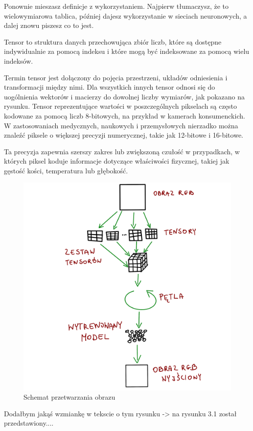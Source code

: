 \documentclass[brudnopis]{xmgr}
\begin{document}
Ponownie mieszasz definicje z wykorzystaniem. Najpierw tłumaczysz, że to wielowymiarowa tablica, później dajesz wykorzystanie w sieciach neuronowych, a dalej znowu piszesz co to jest.

Tensor to struktura danych przechowująca zbiór liczb, które są dostępne indywidualnie za pomocą indeksu i które mogą być indeksowane za pomocą wielu indeksów.

Termin tensor jest dołączony do pojęcia przestrzeni, układów odniesienia i transformacji między nimi. Dla wszystkich innych tensor odnosi się do uogólnienia wektorów i macierzy do dowolnej liczby wymiarów, jak pokazano na rysunku.
Tensor reprezentujące wartości w poszczególnych pikselach są często kodowane za pomocą liczb 8-bitowych, na przykład w kamerach konsumenckich. W zastosowaniach medycznych, naukowych i przemysłowych nierzadko można znaleźć piksele o większej precyzji numerycznej, takie jak 12-bitowe i 16-bitowe.

 Ta precyzja zapewnia szerszy zakres lub zwiększoną czułość w przypadkach, w których piksel koduje informacje dotyczące właściwości fizycznej, takiej jak gęstość kości, temperatura lub głębokość.
 
 \begin{figure}[!tbh]
\centering
\includegraphics[width=.8\hsize]{fig/5}
\caption{Schemat przetwarzania obrazu\label{RYS.5}}
\end{figure}

 Dodałbym jakąś wzmiankę w tekscie o tym rysunku -> na rysunku 3.1 został przedstawiony....
\end{document}
